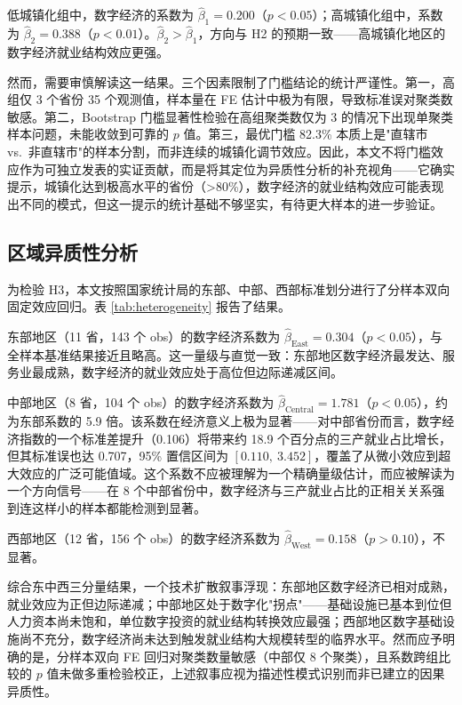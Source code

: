 

低城镇化组中，数字经济的系数为 $\hat{\beta}_1=0.200$（$p<0.05$）；高城镇化组中，系数为 $\hat{\beta}_2=0.388$（$p<0.01$）。$\hat{\beta}_2 > \hat{\beta}_1$，方向与 H2 的预期一致——高城镇化地区的数字经济就业结构效应更强。

然而，需要审慎解读这一结果。三个因素限制了门槛结论的统计严谨性。第一，高组仅 3 个省份 35 个观测值，样本量在 FE 估计中极为有限，导致标准误对聚类数敏感。第二，Bootstrap 门槛显著性检验在高组聚类数仅为 3 的情况下出现单聚类样本问题，未能收敛到可靠的 $p$ 值。第三，最优门槛 82.3\% 本质上是"直辖市 vs.\ 非直辖市"的样本分割，而非连续的城镇化调节效应。因此，本文不将门槛效应作为可独立发表的实证贡献，而是将其定位为异质性分析的补充视角——它确实提示，城镇化达到极高水平的省份（>80\%），数字经济的就业结构效应可能表现出不同的模式，但这一提示的统计基础不够坚实，有待更大样本的进一步验证。

\subsection{区域异质性分析}

为检验 H3，本文按照国家统计局的东部、中部、西部标准划分进行了分样本双向固定效应回归。表 \ref{tab:heterogeneity} 报告了结果。



东部地区（11 省，143 个 obs）的数字经济系数为 $\hat{\beta}_{\text{East}}=0.304$（$p<0.05$），与全样本基准结果接近且略高。这一量级与直觉一致：东部地区数字经济最发达、服务业最成熟，数字经济的就业效应处于高位但边际递减区间。

中部地区（8 省，104 个 obs）的数字经济系数为 $\hat{\beta}_{\text{Central}}=1.781$（$p<0.05$），约为东部系数的 5.9 倍。该系数在经济意义上极为显著——对中部省份而言，数字经济指数的一个标准差提升（0.106）将带来约 18.9 个百分点的三产就业占比增长，但其标准误也达 0.707，95\% 置信区间为 $[0.110,\ 3.452]$，覆盖了从微小效应到超大效应的广泛可能值域。这个系数不应被理解为一个精确量级估计，而应被解读为一个方向信号——在 8 个中部省份中，数字经济与三产就业占比的正相关关系强到连这样小的样本都能检测到显著。

西部地区（12 省，156 个 obs）的数字经济系数为 $\hat{\beta}_{\text{West}}=0.158$（$p>0.10$），不显著。

综合东中西三分量结果，一个技术扩散叙事浮现：东部地区数字经济已相对成熟，就业效应为正但边际递减；中部地区处于数字化"拐点"——基础设施已基本到位但人力资本尚未饱和，单位数字投资的就业结构转换效应最强；西部地区数字基础设施尚不充分，数字经济尚未达到触发就业结构大规模转型的临界水平。然而应予明确的是，分样本双向 FE 回归对聚类数量敏感（中部仅 8 个聚类），且系数跨组比较的 $p$ 值未做多重检验校正，上述叙事应视为描述性模式识别而非已建立的因果异质性。

